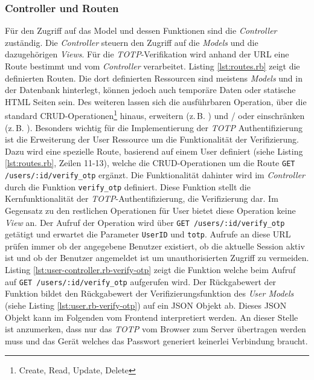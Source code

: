 \documentclass[11pt,a4paper,ngerman]{scrreprt}
\begin{document}
\subsubsection{Controller und Routen}
Für den Zugriff auf das Model und dessen Funktionen sind die \textit{Controller} zuständig. Die \textit{Controller} steuern den Zugriff auf die \textit{Models} und die dazugehörigen \textit{Views}. Für die \textit{TOTP}-Verifikation wird anhand der URL eine Route bestimmt und vom \textit{Controller} verarbeitet. Listing \ref{lst:routes.rb} zeigt die definierten Routen. Die dort definierten Ressourcen sind meistens \textit{Models} und in der Datenbank hinterlegt, können jedoch auch temporäre Daten oder statische HTML Seiten sein. Des weiteren lassen sich die ausführbaren Operation, über die standard CRUD-Operationen\footnote{Create, Read, Update, Delete} hinaus, erweitern (z.\,B. ) und / oder einschränken (z.\,B. ). Besonders wichtig für die Implementierung der \textit{TOTP} Authentifizierung ist die Erweiterung der User Ressource um die Funktionalität der Verifizierung. Dazu wird eine spezielle Route, basierend auf einem User definiert (siehe Listing \ref{lst:routes.rb}, Zeilen 11-13), welche die CRUD-Operationen um die Route \texttt{GET /users/:id/verify\_otp} ergänzt. Die Funktionalität dahinter wird im \textit{Controller} durch die Funktion \texttt{verify\_otp} definiert. Diese Funktion stellt die Kernfunktionalität der \textit{TOTP}-Authentifizierung, die Verifizierung dar. Im Gegensatz zu den restlichen Operationen für User bietet diese Operation keine \textit{View} an. Der Aufruf der Operation wird über \texttt{GET /users/:id/verify\_otp} getätigt und erwartet die Parameter \texttt{UserID} und \texttt{totp}. Aufrufe an diese URL prüfen immer ob der angegebene Benutzer existiert, ob die aktuelle Session aktiv ist und ob der Benutzer angemeldet ist um unauthorisierten Zugriff zu vermeiden. Listing \ref{lst:user-controller.rb-verify-otp} zeigt die Funktion welche beim Aufruf auf \texttt{GET /users/:id/verify\_otp} aufgerufen wird. Der Rückgabewert der Funktion bildet den Rückgabewert der Verifizierungsfunktion des \textit{User Models} (siehe Listing \ref{lst:user.rb-verify-otp}) auf ein JSON Objekt ab. Dieses JSON Objekt kann im Folgenden vom Frontend interpretiert werden. An dieser Stelle ist anzumerken, dass nur das \textit{TOTP} vom Browser zum Server übertragen werden muss und das Gerät welches das Passwort generiert keinerlei Verbindung braucht.
\end{document}
